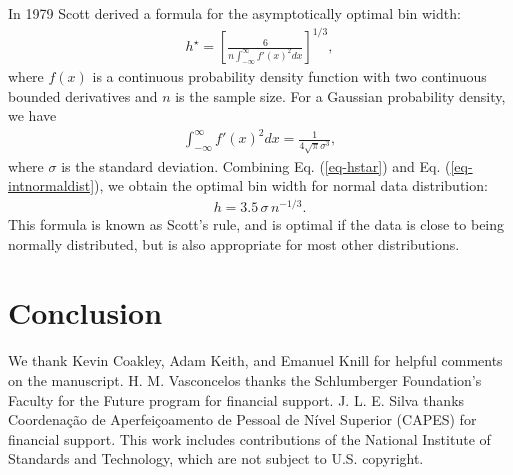 \documentclass[
reprint,
superscriptaddress,
showpacs,
amsmath,
amssymb,
aps,
pra,
longbibliography
]{revtex4-1}
\begin{document}
In 1979 Scott derived a formula for the asymptotically optimal bin width:
\begin{eqnarray}
h^{\star} = \left[ \frac{6}{n \int_{-\infty}^{\infty} f'(x)^2 dx} \right]^{1/3},
\label{eq-hstar}
\end{eqnarray}
where $f(x)$ is a continuous probability density function with two continuous bounded derivatives and $n$ is the sample size. 
For a Gaussian probability density, we have
\begin{eqnarray}
\int_{-\infty}^{\infty} f'(x)^2 dx = \frac{1}{4 \sqrt{\pi} \sigma ^3},
\label{eq-intnormaldist}
\end{eqnarray}
where $\sigma$ is the standard deviation. Combining Eq. (\ref{eq-hstar}) and Eq. (\ref{eq-intnormaldist}), we obtain the 
optimal bin width for normal data distribution:
\begin{eqnarray}
h = 3.5 \, \sigma \, n^{-1/3}.
\end{eqnarray}
This formula is known as Scott's rule, and is optimal if the data is close to being normally distributed, but is also 
appropriate for most other distributions.

\section{Conclusion}
\label{conclusion}



\begin{acknowledgments}
We thank Kevin Coakley, Adam Keith, and Emanuel Knill for helpful
comments on the manuscript.  H. M. Vasconcelos thanks the Schlumberger Foundation's Faculty for 
the Future program for financial support. J. L. E. Silva thanks Coordena\c c\~ao de Aperfei\c coamento de 
Pessoal de N\'ivel Superior (CAPES) for financial support. This work includes contributions of the National 
Institute of Standards and Technology, which are not subject to U.S. copyright.
\end{acknowledgments}




%


\end{document}
